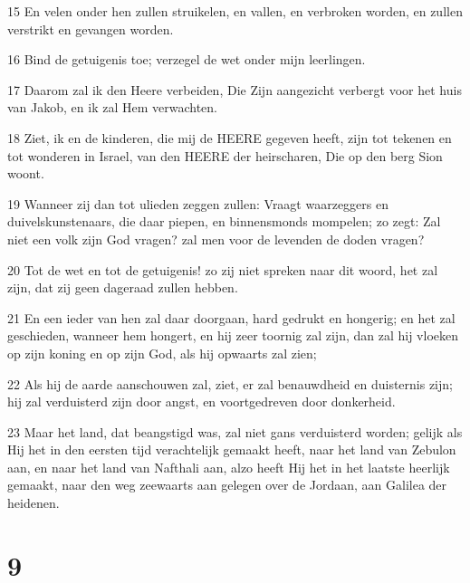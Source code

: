 \par 15 En velen onder hen zullen struikelen, en vallen, en verbroken worden, en zullen verstrikt en gevangen worden.
\par 16 Bind de getuigenis toe; verzegel de wet onder mijn leerlingen.
\par 17 Daarom zal ik den Heere verbeiden, Die Zijn aangezicht verbergt voor het huis van Jakob, en ik zal Hem verwachten.
\par 18 Ziet, ik en de kinderen, die mij de HEERE gegeven heeft, zijn tot tekenen en tot wonderen in Israel, van den HEERE der heirscharen, Die op den berg Sion woont.
\par 19 Wanneer zij dan tot ulieden zeggen zullen: Vraagt waarzeggers en duivelskunstenaars, die daar piepen, en binnensmonds mompelen; zo zegt: Zal niet een volk zijn God vragen? zal men voor de levenden de doden vragen?
\par 20 Tot de wet en tot de getuigenis! zo zij niet spreken naar dit woord, het zal zijn, dat zij geen dageraad zullen hebben.
\par 21 En een ieder van hen zal daar doorgaan, hard gedrukt en hongerig; en het zal geschieden, wanneer hem hongert, en hij zeer toornig zal zijn, dan zal hij vloeken op zijn koning en op zijn God, als hij opwaarts zal zien;
\par 22 Als hij de aarde aanschouwen zal, ziet, er zal benauwdheid en duisternis zijn; hij zal verduisterd zijn door angst, en voortgedreven door donkerheid.
\par 23 Maar het land, dat beangstigd was, zal niet gans verduisterd worden; gelijk als Hij het in den eersten tijd verachtelijk gemaakt heeft, naar het land van Zebulon aan, en naar het land van Nafthali aan, alzo heeft Hij het in het laatste heerlijk gemaakt, naar den weg zeewaarts aan gelegen over de Jordaan, aan Galilea der heidenen.

\chapter{9}

